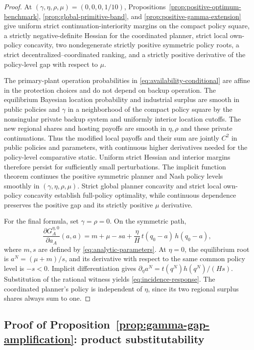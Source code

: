 \begin{proof}
At $(\gamma,\eta,\rho,\mu)=(0,0,0,1/10)$,
Propositions~\ref{prop:positive-optimum-benchmark},
\ref{prop:global-primitive-band}, and
\ref{prop:positive-gamma-extension} give uniform strict
continuation-interiority margins on the compact policy square,
a strictly negative-definite Hessian for the coordinated
planner, strict local own-policy concavity, two nondegenerate
strictly positive symmetric policy roots, a strict
decentralized--coordinated ranking, and a strictly positive
derivative of the policy-level gap with respect to $\mu$.

The primary-plant operation probabilities in
\eqref{eq:availability-conditional} are affine in
the protection choices and do not depend on backup operation.
The equilibrium Bayesian location probability and industrial
surplus are smooth in public policies and $\gamma$
in a neighborhood of the compact policy square by the
nonsingular private backup system and uniformly interior
location cutoffs. The new regional shares and hosting payoffs
are smooth in $\eta,\rho$ and these private continuations. Thus the modified local
payoffs and their sum are jointly $C^2$ in public policies
and parameters, with continuous higher derivatives needed
for the policy-level comparative static. Uniform strict
Hessian and interior margins therefore persist for
sufficiently small perturbations. The implicit function
theorem continues the positive symmetric planner and Nash
policy levels smoothly in $(\gamma,\eta,\rho,\mu)$.
Strict global planner concavity and strict local own-policy
concavity establish full-policy optimality, while
continuous dependence preserves the positive gap and its
strictly positive $\mu$ derivative.

For the final formula, set $\gamma=\rho=0$. On the
symmetric path,
\[
\frac{\partial G_A^{\eta,0}}{\partial a_A}(a,a)
=m+\mu-sa+\frac{\eta}{H}\,
 t(q_0-a)\,h(q_0-a),
\]
where $m,s$ are defined by \eqref{eq:analytic-parameters}.
At $\eta=0$, the equilibrium root is
$a^N=(\mu+m)/s$, and its derivative with
respect to the same common policy level is $-s<0$.
Implicit differentiation gives
$\partial_\eta a^N=t(q^N)h(q^N)/(Hs)$.
Substitution of the rational witness yields
\eqref{eq:incidence-response}. The coordinated planner's
policy is independent of $\eta$, since its two regional
surplus shares always sum to one.
\end{proof}



\subsection{Proof of Proposition~\ref{prop:gamma-gap-amplification}: product substitutability}
\label{app:jpet-additional-proof-5}

